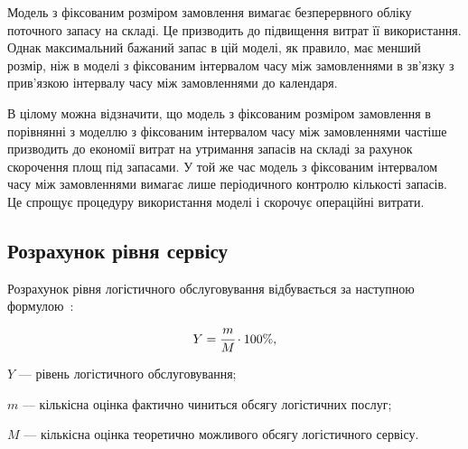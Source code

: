 Модель з фіксованим розміром замовлення вимагає безперервного обліку поточного запасу на складі.
Це призводить до підвищення витрат її використання.
Однак максимальний бажаний запас в цій моделі, як правило, має менший розмір, ніж в моделі з фіксованим інтервалом часу між замовленнями в зв'язку з прив'язкою інтервалу часу між замовленнями до календаря.

В цілому можна відзначити, що модель з фіксованим розміром замовлення в порівнянні з моделлю з фіксованим інтервалом часу між замовленнями частіше призводить до економії витрат на утримання запасів на складі за рахунок скорочення площ під запасами.
У той же час модель з фіксованим інтервалом часу між замовленнями вимагає лише періодичного контролю кількості запасів.
Це спрощує процедуру використання моделі і скорочує операційні витрати.

\subsection{Розрахунок рівня сервісу}
Розрахунок рівня логістичного обслуговування відбувається за наступною формулою~\cite{Sterligova2008}:
\begin{equation}
Y=\cfrac{m}{M} \cdot 100\%
,
\end{equation}
\begin{description}
	\item[де] $Y$ --- рівень логістичного обслуговування;
	\item $m$ --- кількісна оцінка фактично чиниться обсягу логістичних послуг;
	\item $M$ --- кількісна оцінка теоретично можливого обсягу логістичного сервісу.
\end{description}
